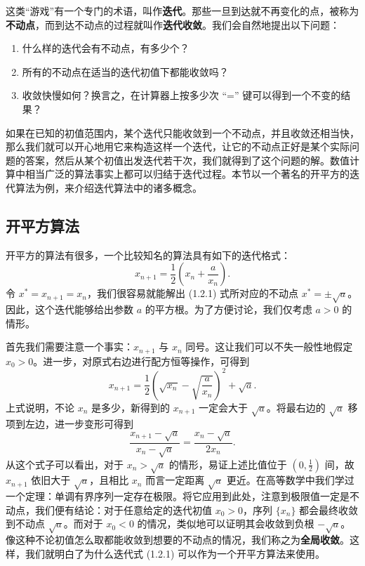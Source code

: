 这类“游戏”有一个专门的术语，叫作\textbf{迭代}。那些一旦到达就不再变化的点，被称为\textbf{不动点}，而到达不动点的过程就叫作\textbf{迭代收敛}。我们会自然地提出以下问题：
\begin{enumerate}
\item 什么样的迭代会有不动点，有多少个？
\item 所有的不动点在适当的迭代初值下都能收敛吗？
\item 收敛快慢如何？换言之，在计算器上按多少次 ``='' 键可以得到一个不变的结果？
\end{enumerate}

如果在已知的初值范围内，某个迭代只能收敛到一个不动点，并且收敛还相当快，那么我们就可以开心地用它来构造这样一个迭代，让它的不动点正好是某个实际问题的答案，然后从某个初值出发迭代若干次，我们就得到了这个问题的解。数值计算中相当广泛的算法事实上都可以归结于迭代过程。本节以一个著名的开平方的迭代算法为例，来介绍迭代算法中的诸多概念。

\subsection{开平方算法}

开平方的算法有很多，一个比较知名的算法具有如下的迭代格式：
\begin{equation}
 x_{n+1}=\frac12\left(x_n+\frac{a}{x_n}\right).
\tag{1.2.1}
\end{equation}
令 $x^*=x_{n+1}=x_n$，我们很容易就能解出 (1.2.1) 式所对应的不动点 $x^*=\pm\sqrt a$。因此，这个迭代能够给出参数 $a$ 的平方根。为了方便讨论，我们仅考虑 $a>0$ 的情形。

首先我们需要注意一个事实：$x_{n+1}$ 与 $x_n$ 同号。这让我们可以不失一般性地假定 $x_0>0$。进一步，对原式右边进行配方恒等操作，可得到
\begin{equation}
 x_{n+1}=\frac12\left(\sqrt{x_n}-\sqrt{\frac{a}{x_n}}\right)^2+\sqrt a.
\tag{1.2.2}
\end{equation}
上式说明，不论 $x_n$ 是多少，新得到的 $x_{n+1}$ 一定会大于 $\sqrt a$。将最右边的 $\sqrt a$ 移项到左边，进一步变形可得到
\begin{equation}
 \frac{x_{n+1}-\sqrt a}{x_n-\sqrt a}=\frac{x_n-\sqrt a}{2x_n}.
\tag{1.2.3}
\end{equation}
从这个式子可以看出，对于 $x_n>\sqrt a$ 的情形，易证上述比值位于 $\left(0,\frac12\right)$ 间，故 $x_{n+1}$ 依旧大于 $\sqrt a$，且相比 $x_n$ 而言一定距离 $\sqrt a$ 更近。在高等数学中我们学过一个定理：单调有界序列一定存在极限。将它应用到此处，注意到极限值一定是不动点，我们便有结论：对于任意给定的迭代初值 $x_0>0$，序列 $\{x_n\}$ 都会最终收敛到不动点 $\sqrt a$。而对于 $x_0<0$ 的情况，类似地可以证明其会收敛到负根 $-\sqrt a$。像这种不论初值怎么取都能收敛到想要的不动点的情况，我们称之为\textbf{全局收敛}。这样，我们就明白了为什么迭代式 (1.2.1) 可以作为一个开平方算法来使用。

